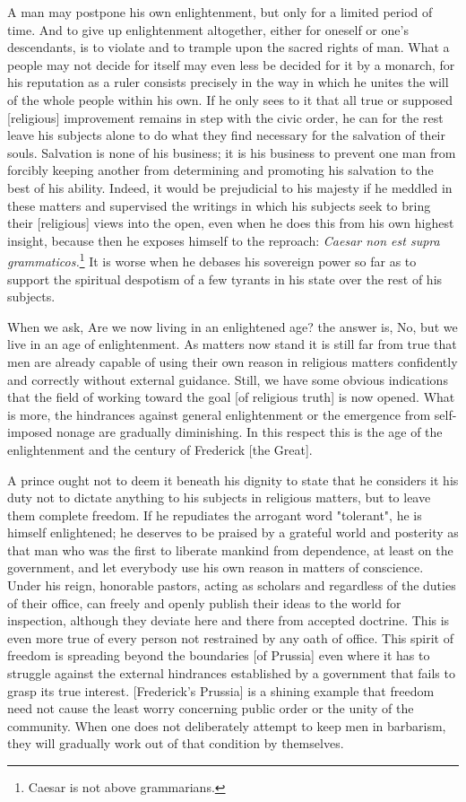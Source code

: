 \documentclass[12pt]{article}
\begin{document}
A man may postpone his own enlightenment, but only for a limited period of time. And to give up enlightenment altogether, either for oneself or one's descendants, is to violate and to trample upon the sacred rights of man. What a people may not decide for itself may even less be decided for it by a monarch, for his reputation as a ruler consists precisely in the way in which he unites the will of the whole people within his own. If he only sees to it that all true or supposed [religious] improvement remains in step with the civic order, he can for the rest leave his subjects alone to do what they find necessary for the salvation of their souls. Salvation is none of his business; it is his business to prevent one man from forcibly keeping another from determining and promoting his salvation to the best of his ability. Indeed, it would be prejudicial to his majesty if he meddled in these matters and supervised the writings in which his subjects seek to bring their [religious] views into the open, even when he does this from his own highest insight, because then he exposes himself to the reproach: \textit{Caesar non est supra grammaticos.}\footnote{Caesar is not above grammarians.}    It is worse when he debases his sovereign power so far as to support the spiritual despotism of a few tyrants in his state over the rest of his subjects.

When we ask, Are we now living in an enlightened age? the answer is, No, but we live in an age of enlightenment. As matters now stand it is still far from true that men are already capable of using their own reason in religious matters confidently and correctly without external guidance. Still, we have some obvious indications that the field of working toward the goal [of religious truth] is now opened. What is more, the hindrances against general enlightenment or the emergence from self-imposed nonage are gradually diminishing. In this respect this is the age of the enlightenment and the century of Frederick [the Great].

A prince ought not to deem it beneath his dignity to state that he considers it his duty not to dictate anything to his subjects in religious matters, but to leave them complete freedom. If he repudiates the arrogant word "tolerant", he is himself enlightened; he deserves to be praised by a grateful world and posterity as that man who was the first to liberate mankind from dependence, at least on the government, and let everybody use his own reason in matters of conscience. Under his reign, honorable pastors, acting as scholars and regardless of the duties of their office, can freely and openly publish their ideas to the world for inspection, although they deviate here and there from accepted doctrine. This is even more true of every person not restrained by any oath of office. This spirit of freedom is spreading beyond the boundaries [of Prussia] even where it has to struggle against the external hindrances established by a government that fails to grasp its true interest. [Frederick's Prussia] is a shining example that freedom need not cause the least worry concerning public order or the unity of the community. When one does not deliberately attempt to keep men in barbarism, they will gradually work out of that condition by themselves.
\end{document}
